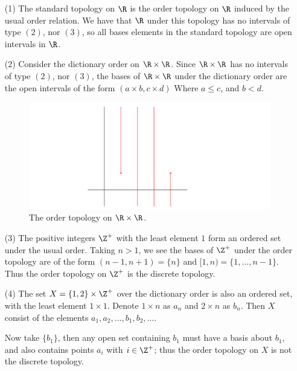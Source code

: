 \begin{example}
    \begin{enumerate}
        \item[(1)] The standard topology on $\R$ is the order topology on $\R$ induced by the
            usual order relation. We have that $\R$ under this topology has no intervals of
            type  $(2)$, nor  $(3)$, so all bases elements in the standard topology are
            open intervals in $\R$.

        \item[(2)] Consider the dictionary order on  $\R \times \R$. Since  $\R \times \R$ has
            no intervals of type $(2)$, nor $(3)$, the bases of  $\R \times \R$ under the
            dictionary order are the open intervals of the form  $(a \times b, c \times d)$ Where
             $a \leq c$, and  $b<d$.

             \begin{figure}[h]
                 \centering
                 \includegraphics[scale = 0.3]{Figures/Chapter1/orderTopologyOnRxR.png}
                 \caption{The order topology on $\R \times \R$.}
                 \label{fig1.3}
             \end{figure}

         \item[(3)] The positive integers  $\Z^+$ with the least element  $1$ form an ordered set
             under the usual order. Taking  $n>1$, we see the bases of  $\Z^+$ under the order
             topology are of the form  $(n-1,n+1)=\{n\}$ and $[1,n)=\{1, \dots ,n-1\}$. Thus
             the order topology on  $\Z^+$ is the discrete topology.


         \item[(4)] The set  $X=\{1,2\} \times \Z^+$ over the dictionary order is also an ordered set,
             with the least element  $1 \times 1$. Denote  $1 \times n$ as  $a_n$ and  $2 \times n$ as
              $b_n$. Then  $X$ consist of the elements  $a_1,a_2, \dots,b_1,b_2,\dots$.

              Now take $\{b_1\}$, then any open set containing $b_1$ must have a basis
              about $b_1$, and also contains points $a_i$ with  $i \in \Z^+$; thus the
              order topology on  $X$ is not the discrete topology.
    \end{enumerate}
\end{example}

